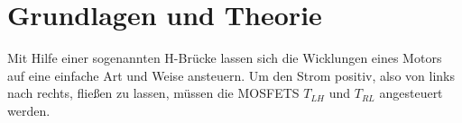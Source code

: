 \section{Grundlagen und Theorie}

Mit Hilfe einer sogenannten H-Brücke lassen sich die Wicklungen eines
Motors auf eine einfache Art und Weise ansteuern.
Um den Strom positiv, also von links nach rechts, fließen zu lassen,
müssen die MOSFETS $T_{LH}$ und $T_{RL}$ angesteuert werden.










